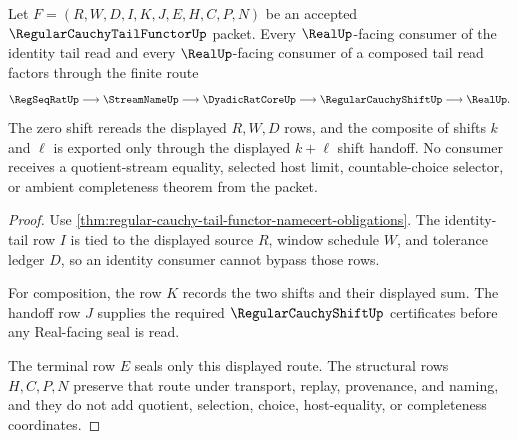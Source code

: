 \begin{theorem}
\label{thm:regular-cauchy-tail-functor-identity-composition}
Let $F=(R,W,D,I,K,J,E,H,C,P,N)$ be an accepted $\RegularCauchyTailFunctorUp$ packet. Every $\RealUp$-facing consumer of the identity tail read and every $\RealUp$-facing consumer of a composed tail read factors through the finite route
$$
\RegSeqRatUp \longrightarrow \StreamNameUp \longrightarrow \DyadicRatCoreUp \longrightarrow \RegularCauchyShiftUp \longrightarrow \RealUp .
$$
The zero shift rereads the displayed $R,W,D$ rows, and the composite of shifts $k$ and $\ell$ is exported only through the displayed $k+\ell$ shift handoff. No consumer receives a quotient-stream equality, selected host limit, countable-choice selector, or ambient completeness theorem from the packet.
\end{theorem}
\begin{proof}
Use \autoref{thm:regular-cauchy-tail-functor-namecert-obligations}. The identity-tail row $I$ is tied to the displayed source $R$, window schedule $W$, and tolerance ledger $D$, so an identity consumer cannot bypass those rows.

For composition, the row $K$ records the two shifts and their displayed sum. The handoff row $J$ supplies the required $\RegularCauchyShiftUp$ certificates before any Real-facing seal is read.

The terminal row $E$ seals only this displayed route. The structural rows $H,C,P,N$ preserve that route under transport, replay, provenance, and naming, and they do not add quotient, selection, choice, host-equality, or completeness coordinates.
\end{proof}


